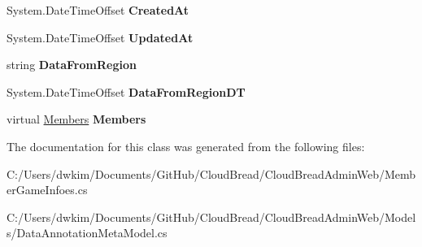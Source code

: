 \begin{DoxyCompactItemize}
\item 
System.\+Date\+Time\+Offset {\bfseries Created\+At}\hypertarget{class_cloud_bread_admin_web_1_1_member_game_infoes_a1eedfd38a7f73f617fae4c99689efec2}{}\label{class_cloud_bread_admin_web_1_1_member_game_infoes_a1eedfd38a7f73f617fae4c99689efec2}

\item 
System.\+Date\+Time\+Offset {\bfseries Updated\+At}\hypertarget{class_cloud_bread_admin_web_1_1_member_game_infoes_a145aedc78a55ca2de533ba1853fe7d4c}{}\label{class_cloud_bread_admin_web_1_1_member_game_infoes_a145aedc78a55ca2de533ba1853fe7d4c}

\item 
string {\bfseries Data\+From\+Region}\hypertarget{class_cloud_bread_admin_web_1_1_member_game_infoes_a96ab395fc35abaf272db437bf2dc0e2d}{}\label{class_cloud_bread_admin_web_1_1_member_game_infoes_a96ab395fc35abaf272db437bf2dc0e2d}

\item 
System.\+Date\+Time\+Offset {\bfseries Data\+From\+Region\+DT}\hypertarget{class_cloud_bread_admin_web_1_1_member_game_infoes_add0f2fd40b1bbb50f70a3589899a46e3}{}\label{class_cloud_bread_admin_web_1_1_member_game_infoes_add0f2fd40b1bbb50f70a3589899a46e3}

\item 
virtual \hyperlink{class_cloud_bread_admin_web_1_1_members}{Members} {\bfseries Members}\hypertarget{class_cloud_bread_admin_web_1_1_member_game_infoes_af2d86fb53e7aaa690e9fe4188cd44fe9}{}\label{class_cloud_bread_admin_web_1_1_member_game_infoes_af2d86fb53e7aaa690e9fe4188cd44fe9}

\end{DoxyCompactItemize}


The documentation for this class was generated from the following files\+:\begin{DoxyCompactItemize}
\item 
C\+:/\+Users/dwkim/\+Documents/\+Git\+Hub/\+Cloud\+Bread/\+Cloud\+Bread\+Admin\+Web/Member\+Game\+Infoes.\+cs\item 
C\+:/\+Users/dwkim/\+Documents/\+Git\+Hub/\+Cloud\+Bread/\+Cloud\+Bread\+Admin\+Web/\+Models/Data\+Annotation\+Meta\+Model.\+cs\end{DoxyCompactItemize}
